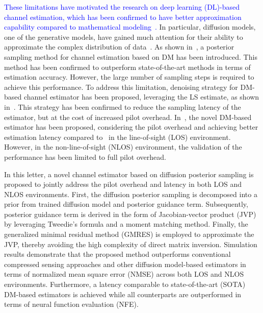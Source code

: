 \documentclass[lettersize,journal]{IEEEtran}
\begin{document}
\textcolor{blue}{These limitations have motivated the research on deep learning (DL)-based channel estimation, which has been confirmed to have better approximation capability compared to mathematical modeling~\cite{kimDeepLearningaidedWireless2023, heDeepLearningBasedChannel2018}.} In particular, diffusion models, one of the generative models, have gained much attention for their ability to approximate the complex distribution of data~\cite{arvinteMIMOChannelEstimation2023,feslDiffusionBasedGenerativePrior2024,zhouGenerativeDiffusionModels2025}. As shown in~\cite{arvinteMIMOChannelEstimation2023}, a posterior sampling method for channel estimation based on DM has been introduced. This method has been confirmed to outperform state-of-the-art methods in terms of estimation accuracy. However, the large number of sampling steps is required to achieve this performance. To address this limitation, denoising strategy for DM-based channel estimator has been proposed, leveraging the LS estimate, as shown in~\cite{feslDiffusionBasedGenerativePrior2024}. This strategy has been confirmed to reduce the sampling latency of the estimator, but at the cost of increased pilot overhead. In~\cite{zhouGenerativeDiffusionModels2025}, the novel DM-based estimator has been proposed, considering the pilot overhead and achieving better estimation latency compared to~\cite{arvinteMIMOChannelEstimation2023} in the line-of-sight (LOS) environment. However, in the non-line-of-sight (NLOS) environment, the validation of the performance has been limited to full pilot overhead.

In this letter, a novel channel estimator based on diffusion posterior sampling is proposed to jointly address the pilot overhead and latency in both LOS and NLOS environments. First, the diffusion posterior sampling is decomposed into a prior from trained diffusion model and posterior guidance term. Subsequently, posterior guidance term is derived in the form of Jacobian-vector product (JVP) by leveraging Tweedie’s formula and a moment matching method. Finally, the generalized minimal residual method (GMRES) is employed to approximate the JVP, thereby avoiding the high complexity of direct matrix inversion. Simulation results demonstrate that the proposed method outperforms conventional compressed sensing approaches and other diffusion model-based estimators in terms of normalized mean square error (NMSE) across both LOS and NLOS environments. Furthermore, a latency comparable to state-of-the-art (SOTA) DM-based estimators is achieved while all counterparts are outperformed in terms of neural function evaluation (NFE).
\end{document}
